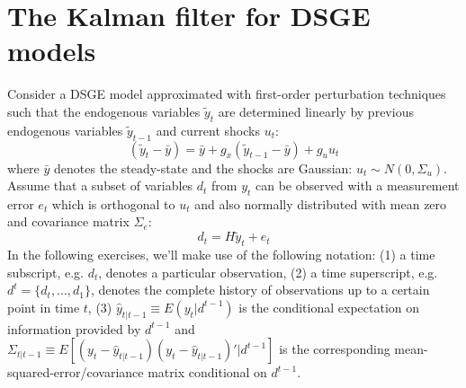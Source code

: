 \section[The Kalman filter for DSGE models]{The Kalman filter for DSGE models\label{ex:KalmanFilterDSGE}}
Consider a DSGE model approximated with first-order perturbation techniques such that the endogenous variables $\tilde{y}_t$ are determined linearly by previous endogenous variables $\tilde{y}_{t-1}$ and current shocks $u_t$:
$$(\tilde{y}_t - \bar{y}) = \bar{y} + g_x (\tilde{y}_{t-1} - \bar{y}) + g_u u_t$$
where $\bar{y}$ denotes the steady-state and the shocks are Gaussian: $u_t \sim N(0,\Sigma_u)$. Assume that a subset of variables $d_t$ from $y_t$ can be observed with a measurement error $e_t$ which is orthogonal to $u_t$ and also normally distributed with mean zero and covariance matrix $\Sigma_e$:
$$d_t = H \tilde{y}_t + e_t$$
In the following exercises, we'll make use of the following notation: (1) a time subscript, e.g. $d_t$, denotes a particular observation, (2) a time superscript, e.g. $d^t=\{d_t,...,d_1\}$, denotes the complete history of observations up to a certain point in time $t$, (3) $\hat{y}_{t|t-1} \equiv E(y_t|d^{t-1})$ is the conditional expectation on information provided by $d^{t-1}$ and $\Sigma_{t|t-1} \equiv E\left[ (y_t-\hat{y}_{t|t-1}) (y_t-\hat{y}_{t|t-1})'|d^{t-1}\right]$ is the corresponding mean-squared-error/covariance matrix conditional on $d^{t-1}$.

